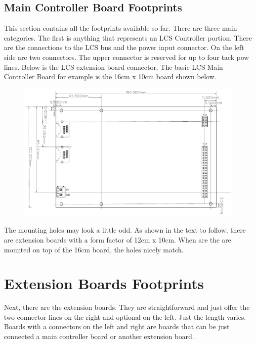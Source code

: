 \subsection{Main Controller Board Footprints}

This section contains all the footprints available so far. There are three main categories. The first is anything that represents an LCS Controller portion. There are the connections to the LCS bus and the power input connector. On the left side are two connectors. The upper connector is reserved for up to four tack pow lines. Below is the LCS extension board connector. The basic LCS Main Controller Board for example is the 16cm x 10cm board shown below.

\begin{figure}[ht]
    \centering
    \includegraphics[page=1, width=\textwidth]{./Figures/LCS-FP-MAIN-CTRL-40-10X16.pdf}
\end{figure}

\FloatBarrier

The mounting holes may look a little odd. As shown in the text to follow, there are extension boards with a form factor of 12cm x 10cm. When are the are mounted on top of the 16cm board, the holes nicely match. 

\section{Extension Boards Footprints}

Next, there are the extension boards. They are straightforward and just offer the two connector lines on the right and optional on the left. Just the length varies. Boards with a connectors on the left and right are boards that can be just connected a main controller board or another extension board.  

